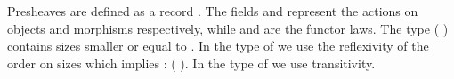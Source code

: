 

Presheaves are defined as a record .  The fields  and
 represent the actions on objects and morphisms respectively,
while  and  are the functor laws. The type  ( ) contains sizes smaller or equal to . In the type
of  we use the reflexivity of the order on sizes which implies  :  ( ).
In the type of  we use transitivity. 
